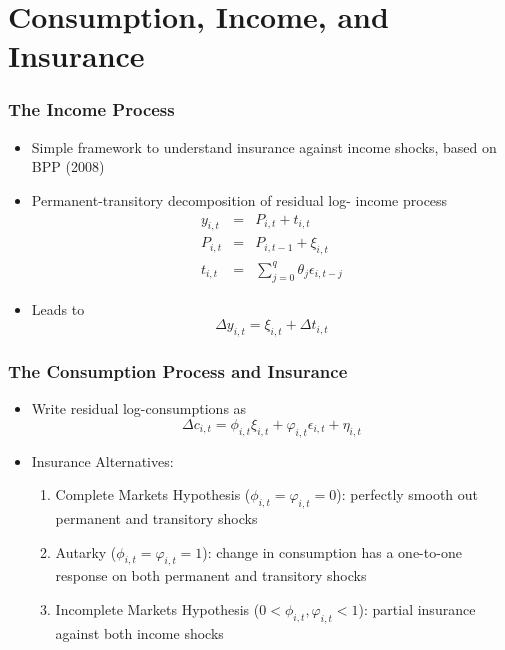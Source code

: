 \section{Consumption, Income, and Insurance}
\begin{frame}
	\frametitle{The Income Process}
	\begin{itemize}
		\item Simple framework to understand insurance against income shocks, based on BPP (2008)
		\item Permanent-transitory decomposition of residual log- income process
			\begin{eqnarray}
y_{i,t} &=&  P_{i,t} + t_{i,t} \nonumber \\
P_{i,t} &=& P_{i,t-1} + \xi_{i,t} \nonumber \\
t_{i,t} &=& \sum \limits _{j=0} ^q \theta_{j} \epsilon_{i,t-j} \nonumber
			\end{eqnarray}
			\item Leads to
			\begin{equation}
\Delta y_{i,t} = \xi_{i,t} + \Delta t_{i,t} \nonumber
			\end{equation}
	\end{itemize}
\end{frame}

\begin{frame}
	\frametitle{The Consumption Process and Insurance}
	\begin{itemize}
		\item Write residual log-consumptions as
		\begin{equation}
\Delta c_{i,t} = \phi_{i,t} \xi_{i,t} + \varphi_{i,t} \epsilon_{i,t} + \eta_{i,t} \nonumber \label{eq:conpro}
		\end{equation} 

		\item Insurance Alternatives:
			\begin{enumerate}
				\item Complete Markets Hypothesis ($\phi_{i,t} = \varphi_{i,t} = 0$): perfectly smooth out permanent and transitory shocks
				\item Autarky ($\phi_{i,t} = \varphi_{i,t} = 1$): change in consumption has a one-to-one response on both permanent and transitory shocks
				\item Incomplete Markets Hypothesis ($0 < \phi_{i,t} , \varphi_{i,t} < 1$): partial insurance against both income shocks
\end{enumerate}
	\end{itemize}
\end{frame}

